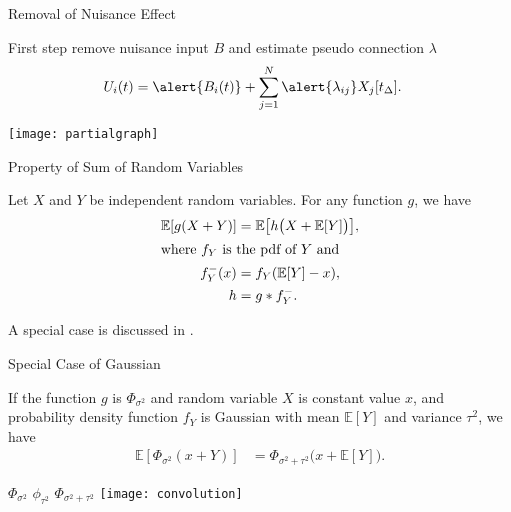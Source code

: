 \documentclass[fleqn,aspectratio=1610]{beamer}
\begin{document}
\begin{frame}[label={sec:org0583848}]{Removal of Nuisance Effect}
\begin{block}{First step}
remove nuisance input \(B\) and estimate pseudo connection \(\lambda\)
\begin{align}
  U_i(t)
  &= \alert{B_i(t)} +
    \sum_{j=1}^{N} \alert{\lambda_{ij}} X_j[t_\Delta].
\end{align}
\end{block}
\centering
\texttt{[image: partialgraph]}
\end{frame}

\begin{frame}[label={sec:orge8f6fe2}]{Property of Sum of Random Variables}
\begin{theorem}[]\label{sec:org8fb8c1d}
Let \(X\) and \(Y\) be independent random variables.
For any function \(g\), we have
\begin{align}
  \mathbb{E}[g(X+Y)]
  &= \mathbb{E}\bigl[h\bigl(X+\mathbb{E}[Y]\bigr)\bigr],\\
  \intertext{where \(f_{Y}\) is the pdf of \(Y\) and}
  f^{-}_{Y}(x) &= f_Y(\mathbb{E}[Y]-x),\\
  h &= g*f^{-}_{Y}.
\end{align}
\end{theorem}
A special case is discussed in \cite{Hyvaerinen2002}.
\end{frame}

\begin{frame}[label={sec:org1416356}]{Special Case of Gaussian}
\begin{corollary}[]\label{sec:org783de79}
If the function \(g\) is \(\Phi_{\sigma^{2}}\)
and random variable \(X\) is constant value \(x\),
and probability density function \(f_Y\) is Gaussian
with mean \(\mathbb{E}[Y]\) and variance \(\tau^{2}\), we have
\begin{align}
  \mathbb{E}[\Phi_{\sigma^{2}}(x+Y)]
  &=\Phi_{\sigma^{2}+\tau^{2}}\bigl(x+\mathbb{E}[Y]\bigr).
\end{align}
\end{corollary}
\begin{center}
\(\Phi_{\sigma^{2}}\)\hspace{.23\linewidth}
\(\phi_{\tau^{2}}\)\hspace{.2\linewidth}
\(\Phi_{\sigma^{2}\!+\!\tau^{2}}\)
\texttt{[image: convolution]}    
\end{center}
\end{frame}
\end{document}
